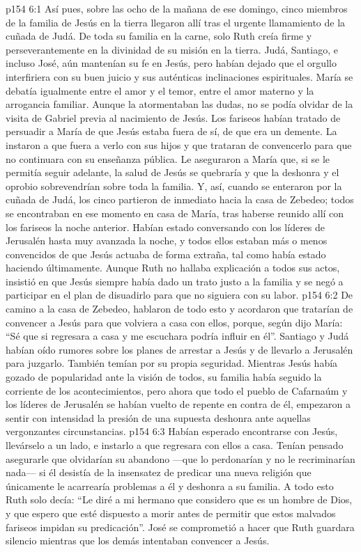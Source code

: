 \vs p154 6:1 Así pues, sobre las ocho de la mañana de ese domingo, cinco miembros de la familia de Jesús en la tierra llegaron allí tras el urgente llamamiento de la cuñada de Judá. De toda su familia en la carne, solo Ruth creía firme y perseverantemente en la divinidad de su misión en la tierra. Judá, Santiago, e incluso José, aún mantenían su fe en Jesús, pero habían dejado que el orgullo interfiriera con su buen juicio y sus auténticas inclinaciones espirituales. María se debatía igualmente entre el amor y el temor, entre el amor materno y la arrogancia familiar. Aunque la atormentaban las dudas, no se podía olvidar de la visita de Gabriel previa al nacimiento de Jesús. Los fariseos habían tratado de persuadir a María de que Jesús estaba fuera de sí, de que era un demente. La instaron a que fuera a verlo con sus hijos y que trataran de convencerlo para que no continuara con su enseñanza pública. Le aseguraron a María que, si se le permitía seguir adelante, la salud de Jesús se quebraría y que la deshonra y el oprobio sobrevendrían sobre toda la familia. Y, así, cuando se enteraron por la cuñada de Judá, los cinco partieron de inmediato hacia la casa de Zebedeo; todos se encontraban en ese momento en casa de María, tras haberse reunido allí con los fariseos la noche anterior. Habían estado conversando con los líderes de Jerusalén hasta muy avanzada la noche, y todos ellos estaban más o menos convencidos de que Jesús actuaba de forma extraña, tal como había estado haciendo últimamente. Aunque Ruth no hallaba explicación a todos sus actos, insistió en que Jesús siempre había dado un trato justo a la familia y se negó a participar en el plan de disuadirlo para que no siguiera con su labor.
\vs p154 6:2 De camino a la casa de Zebedeo, hablaron de todo esto y acordaron que tratarían de convencer a Jesús para que volviera a casa con ellos, porque, según dijo María: “Sé que si regresara a casa y me escuchara podría influir en él”. Santiago y Judá habían oído rumores sobre los planes de arrestar a Jesús y de llevarlo a Jerusalén para juzgarlo. También temían por su propia seguridad. Mientras Jesús había gozado de popularidad ante la visión de todos, su familia había seguido la corriente de los acontecimientos, pero ahora que todo el pueblo de Cafarnaúm y los líderes de Jerusalén se habían vuelto de repente en contra de él, empezaron a sentir con intensidad la presión de una supuesta deshonra ante aquellas vergonzantes circunstancias.
\vs p154 6:3 Habían esperado encontrarse con Jesús, llevárselo a un lado, e instarlo a que regresara con ellos a casa. Tenían pensado asegurarle que olvidarían su abandono ---que lo perdonarían y no le recriminarían nada--- si él desistía de la insensatez de predicar una nueva religión que únicamente le acarrearía problemas a él y deshonra a su familia. A todo esto Ruth solo decía: “Le diré a mi hermano que considero que es un hombre de Dios, y que espero que esté dispuesto a morir antes de permitir que estos malvados fariseos impidan su predicación”. José se comprometió a hacer que Ruth guardara silencio mientras que los demás intentaban convencer a Jesús.
